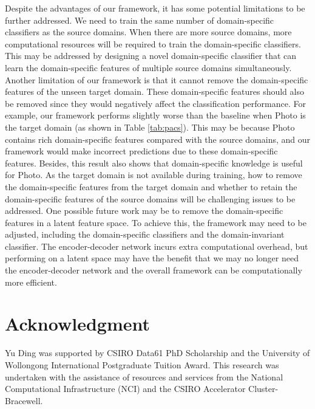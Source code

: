 \documentclass{article}
\begin{document}
Despite the advantages of our framework, it has some potential limitations to be further addressed. We need to train the same number of domain-specific classifiers as the source domains. When there are more source domains, more computational resources will be required to train the domain-specific classifiers. This may be addressed by designing a novel domain-specific classifier that can learn the domain-specific features of multiple source domains simultaneously. Another limitation of our framework is that it cannot remove the domain-specific features of the unseen target domain. These domain-specific features should also be removed since they would negatively affect the classification performance. For example, our framework performs slightly worse than the baseline when Photo is the target domain (as shown in Table \ref{tab:pacs}). This may be because Photo contains rich domain-specific features compared with the source domains, and our framework would make incorrect predictions due to these domain-specific features. Besides, this result also shows that domain-specific knowledge is useful for Photo. As the target domain is not available during training, how to remove the domain-specific features from the target domain and whether to retain the domain-specific features of the source domains will be challenging issues to be addressed. One possible future work may be to remove the domain-specific features in a latent feature space. To achieve this, the framework may need to be adjusted, including the domain-specific classifiers and the domain-invariant classifier. The encoder-decoder network incurs extra computational overhead, but performing on a latent space may have the benefit that we may no longer need the encoder-decoder network and the overall framework can be computationally more efficient.

\section*{Acknowledgment}

Yu Ding was supported by CSIRO Data61 PhD Scholarship and the University of Wollongong International Postgraduate Tuition Award. This research was undertaken with the assistance of resources and services from the National Computational Infrastructure (NCI) and the CSIRO Accelerator Cluster-Bracewell.




\clearpage
\end{document}
